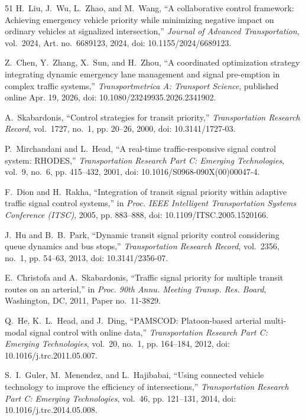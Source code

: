 \documentclass[journal,10pt,twocolumn]{IEEEtran}
\begin{document}
\begin{thebibliography}{51}
H.~Liu, J.~Wu, L.~Zhao, and M.~Wang, ``A collaborative control framework: Achieving emergency vehicle priority while minimizing negative impact on ordinary vehicles at signalized intersection,'' \emph{Journal of Advanced Transportation}, vol.~2024, Art. no.~6689123, 2024, doi: 10.1155/2024/6689123.

Z.~Chen, Y.~Zhang, X.~Sun, and H.~Zhou, ``A coordinated optimization strategy integrating dynamic emergency lane management and signal pre-emption in complex traffic systems,'' \emph{Transportmetrica A: Transport Science}, published online Apr. 19, 2026, doi: 10.1080/23249935.2026.2341902.

A.~Skabardonis, ``Control strategies for transit priority,'' \emph{Transportation Research Record}, vol.~1727, no.~1, pp. 20--26, 2000, doi: 10.3141/1727-03.

P.~Mirchandani and L.~Head, ``A real-time traffic-responsive signal control system: RHODES,'' \emph{Transportation Research Part C: Emerging Technologies}, vol.~9, no.~6, pp. 415--432, 2001, doi: 10.1016/S0968-090X(00)00047-4.

F.~Dion and H.~Rakha, ``Integration of transit signal priority within adaptive traffic signal control systems,'' in \emph{Proc. IEEE Intelligent Transportation Systems Conference (ITSC)}, 2005, pp. 883--888, doi: 10.1109/ITSC.2005.1520166.

J.~Hu and B.~B.~Park, ``Dynamic transit signal priority control considering queue dynamics and bus stops,'' \emph{Transportation Research Record}, vol.~2356, no.~1, pp. 54--63, 2013, doi: 10.3141/2356-07.

E.~Christofa and A.~Skabardonis, ``Traffic signal priority for multiple transit routes on an arterial,'' in \emph{Proc. 90th Annu. Meeting Transp. Res. Board}, Washington, DC, 2011, Paper no.~11-3829.

Q.~He, K.~L.~Head, and J.~Ding, ``PAMSCOD: Platoon-based arterial multi-modal signal control with online data,'' \emph{Transportation Research Part C: Emerging Technologies}, vol.~20, no.~1, pp. 164--184, 2012, doi: 10.1016/j.trc.2011.05.007.

S.~I.~Guler, M.~Menendez, and L.~Hajibabai, ``Using connected vehicle technology to improve the efficiency of intersections,'' \emph{Transportation Research Part C: Emerging Technologies}, vol.~46, pp. 121--131, 2014, doi: 10.1016/j.trc.2014.05.008.


\end{thebibliography}
\end{document}
